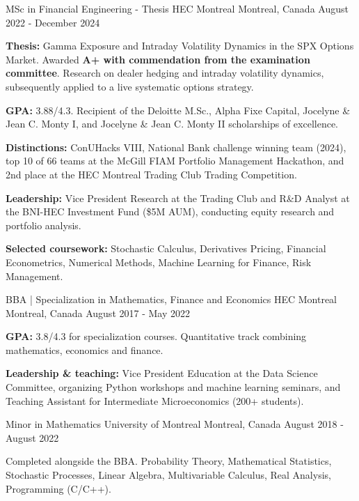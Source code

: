 \begin{cventries}
  \cventry
    {MSc in Financial Engineering - Thesis}
    {HEC Montreal}
    {Montreal, Canada}
    {August 2022 - December 2024}
    {
      \begin{cvitems}
        \item{\textbf{Thesis:} Gamma Exposure and Intraday Volatility Dynamics in the SPX Options Market. Awarded \textbf{A+ with commendation from the examination committee}. Research on dealer hedging and intraday volatility dynamics, subsequently applied to a live systematic options strategy.}
        \item{\textbf{GPA:} 3.88/4.3. Recipient of the Deloitte M.Sc., Alpha Fixe Capital, Jocelyne \& Jean C. Monty I, and Jocelyne \& Jean C. Monty II scholarships of excellence.}
        \item{\textbf{Distinctions:} ConUHacks VIII, National Bank challenge winning team (2024), top 10 of 66 teams at the McGill FIAM Portfolio Management Hackathon, and 2nd place at the HEC Montreal Trading Club Trading Competition.}
        \item{\textbf{Leadership:} Vice President Research at the Trading Club and R\&D Analyst at the BNI-HEC Investment Fund (\$5M AUM), conducting equity research and portfolio analysis.}
        \item{\textbf{Selected coursework:} Stochastic Calculus, Derivatives Pricing, Financial Econometrics, Numerical Methods, Machine Learning for Finance, Risk Management.}
      \end{cvitems}
    }
  \cventry
    {BBA | Specialization in Mathematics, Finance and Economics}
    {HEC Montreal}
    {Montreal, Canada}
    {August 2017 - May 2022}
    {
      \begin{cvitems}
        \item{\textbf{GPA:} 3.8/4.3 for specialization courses. Quantitative track combining mathematics, economics and finance.}
        \item{\textbf{Leadership \& teaching:} Vice President Education at the Data Science Committee, organizing Python workshops and machine learning seminars, and Teaching Assistant for Intermediate Microeconomics (200+ students).}
      \end{cvitems}
    }
  \cventry
    {Minor in Mathematics}
    {University of Montreal}
    {Montreal, Canada}
    {August 2018 - August 2022}
    {
      \begin{cvitems}
        \item{Completed alongside the BBA. Probability Theory, Mathematical Statistics, Stochastic Processes, Linear Algebra, Multivariable Calculus, Real Analysis, Programming (C/C++).}
      \end{cvitems}
    }
\end{cventries}
